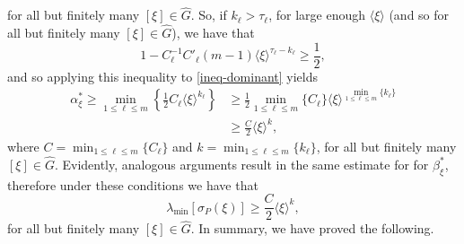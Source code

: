 \documentclass[11pt]{amsart}
\numberwithin{theorem}{section}
\numberwithin{equation}{section}
\theoremstyle{definition}
\numberwithin{example}{section}
\theoremstyle{definition}
\theoremstyle{definition}
\begin{document}
for all but finitely many $[\xi]\in\widehat{G}$. So, if $k_\ell>\tau_\ell$, for large enough $\langle \xi\rangle$ (and so for all but finitely many $[\xi]\in \widehat{G}$), we have that
\begin{equation*}
    1- C_\ell^{-1} C'_\ell(m-1)\langle\xi\rangle^{\tau_\ell-k_\ell}\geq \frac{1}{2},
\end{equation*}
and so applying this inequality to \eqref{ineq-dominant} yields
\begin{align*}
    \alpha^*_\xi\geq \min_{1\leq \ell\leq m}\left\{\frac{1}{2}C_\ell\langle\xi\rangle^{k_\ell}\right\}&\geq \frac{1}{2} \min_{1\leq \ell\leq m}\{C_\ell\}\langle\xi\rangle^{\min_{1\leq \ell\leq m}\{k_\ell\}}\\
    &\geq \frac{C}{2}\langle\xi\rangle^{k},
\end{align*}
where $C= \min_{1\leq \ell\leq m}\{C_\ell\}$ and $k=\min_{1\leq \ell\leq m}\{k_\ell\}$, for all but finitely many $[\xi]\in\widehat{G}$.
Evidently, analogous arguments result in the same estimate for for $\beta^*_\xi$, therefore under these conditions we have that
\begin{equation*}
    \lambda_{\min}[\sigma_P(\xi)]\geq  \frac{C}{2}\langle\xi\rangle^{k},
\end{equation*}
for all but finitely many $[\xi]\in\widehat{G}$. In summary, we have proved the following.
\end{document}
